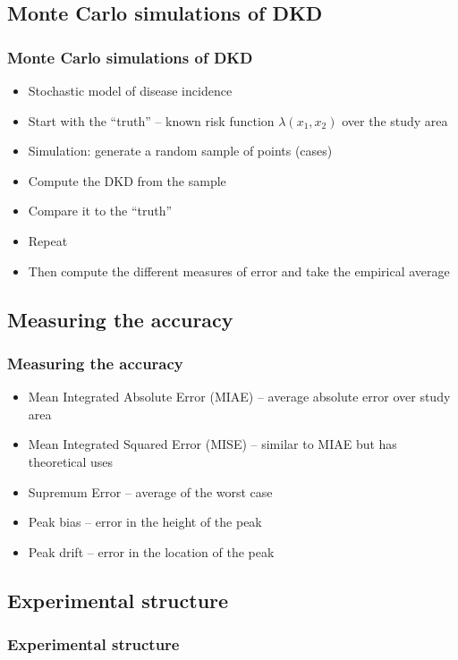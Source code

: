 \documentclass[notheorems]{beamer}
\theoremstyle{definition}
\theoremstyle{example}
\begin{document}
\subsection{Monte Carlo simulations of DKD}
\begin{frame}\frametitle{Monte Carlo simulations of DKD}
    \begin{itemize}
        \item Stochastic model of disease incidence
        \item Start with the ``truth'' -- known risk function $\lambda(x_1, x_2)$ over the study area
        \item Simulation: generate a random sample of points (cases)
        \item Compute the DKD from the sample
        \item Compare it to the ``truth''
        \item Repeat \textellipsis
        \item Then compute the different measures of error and take the empirical average
    \end{itemize}
\end{frame}

\subsection{Measuring the accuracy}
\begin{frame}\frametitle{Measuring the accuracy}
    \begin{itemize}
        \item Mean Integrated Absolute Error (MIAE) -- average absolute error over study area
        \item Mean Integrated Squared Error (MISE) -- similar to MIAE but has theoretical uses
        \item Supremum Error -- average of the worst case
        \item Peak bias -- error in the height of the peak
        \item Peak drift -- error in the location of the peak
    \end{itemize}
\end{frame}

\subsection{Experimental structure}
\begin{frame}\frametitle{Experimental structure}
\end{frame}
\end{document}
